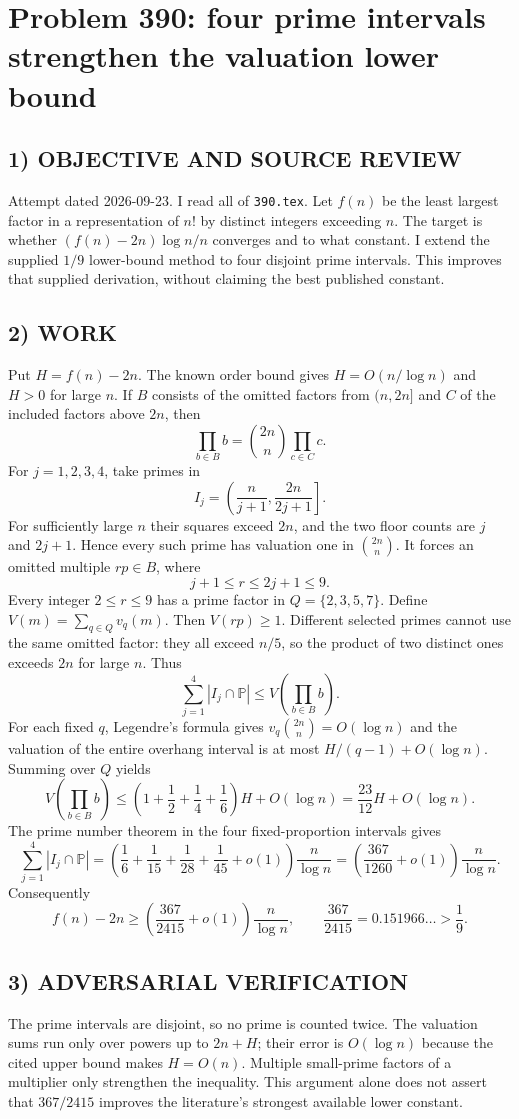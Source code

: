 \section{Problem 390: four prime intervals strengthen the valuation lower bound}
\subsection*{1) OBJECTIVE AND SOURCE REVIEW}
Attempt dated 2026-09-23. I read all of \texttt{390.tex}. Let $f(n)$ be the least largest factor in a representation of $n!$ by distinct integers exceeding $n$. The target is whether $(f(n)-2n)\log n/n$ converges and to what constant. I extend the supplied $1/9$ lower-bound method to four disjoint prime intervals. This improves that supplied derivation, without claiming the best published constant.
\subsection*{2) WORK}
Put $H=f(n)-2n$. The known order bound gives $H=O(n/\log n)$ and $H>0$ for large $n$. If $B$ consists of the omitted factors from $(n,2n]$ and $C$ of the included factors above $2n$, then
\[
\prod_{b\in B}b=\binom{2n}{n}\prod_{c\in C}c.
\]
For $j=1,2,3,4$, take primes in
\[
I_j=\left(\frac n{j+1},\frac{2n}{2j+1}\right].
\]
For sufficiently large $n$ their squares exceed $2n$, and the two floor counts are $j$ and $2j+1$. Hence every such prime has valuation one in $\binom{2n}{n}$. It forces an omitted multiple $rp\in B$, where
\[
j+1\le r\le2j+1\le9.
\]
Every integer $2\le r\le9$ has a prime factor in $Q=\{2,3,5,7\}$. Define $V(m)=\sum_{q\in Q}v_q(m)$. Then $V(rp)\ge1$. Different selected primes cannot use the same omitted factor: they all exceed $n/5$, so the product of two distinct ones exceeds $2n$ for large $n$. Thus
\[
\sum_{j=1}^4|I_j\cap\mathbb P|\le V\left(\prod_{b\in B}b\right).
\]
For each fixed $q$, Legendre's formula gives $v_q\binom{2n}{n}=O(\log n)$ and the valuation of the entire overhang interval is at most $H/(q-1)+O(\log n)$. Summing over $Q$ yields
\[
V\left(\prod_{b\in B}b\right)\le
\left(1+\frac12+\frac14+\frac16\right)H+O(\log n)
=\frac{23}{12}H+O(\log n).
\]
The prime number theorem in the four fixed-proportion intervals gives
\[
\sum_{j=1}^4|I_j\cap\mathbb P|
=\left(\frac16+\frac1{15}+\frac1{28}+\frac1{45}+o(1)\right)\frac n{\log n}
=\left(\frac{367}{1260}+o(1)\right)\frac n{\log n}.
\]
Consequently
\[
f(n)-2n\ge\left(\frac{367}{2415}+o(1)\right)\frac n{\log n},
\qquad \frac{367}{2415}=0.151966\ldots>\frac19.
\]
\subsection*{3) ADVERSARIAL VERIFICATION}
The prime intervals are disjoint, so no prime is counted twice. The valuation sums run only over powers up to $2n+H$; their error is $O(\log n)$ because the cited upper bound makes $H=O(n)$. Multiple small-prime factors of a multiplier only strengthen the inequality. This argument alone does not assert that $367/2415$ improves the literature's strongest available lower constant.
